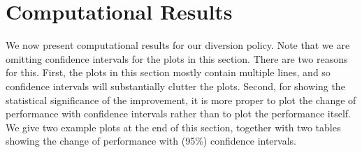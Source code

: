 \section{Computational Results}

We now present computational results for our diversion policy. Note that
we are omitting confidence intervals for the plots in this section. There
are two reasons for this. First, the plots in this section mostly
contain multiple lines, and so confidence intervals will substantially clutter
the plots. Second, for showing the statistical significance of
the improvement, it is more proper to plot the change of performance
with confidence intervals rather than to plot the performance itself.
We give two example plots at the end of this section, together with
two tables showing the change of performance with (95\%) confidence intervals.





